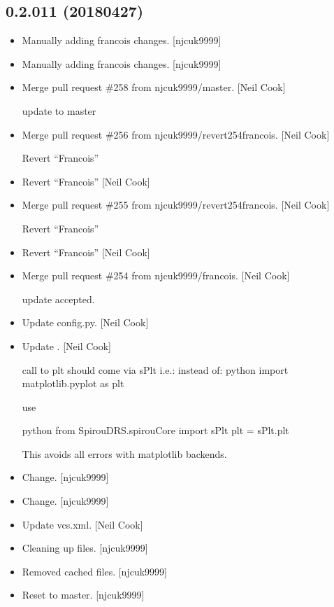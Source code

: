 \documentclass[a4paper,10pt,english]{report}
\begin{document}
\subsection{0.2.011 (2018\sphinxhyphen{}04\sphinxhyphen{}27)}
\label{\detokenize{misc/changelog:id471}}\begin{itemize}
\item {} 
Manually adding francois changes. {[}njcuk9999{]}

\item {} 
Manually adding francois changes. {[}njcuk9999{]}

\item {} 
Merge pull request \#258 from njcuk9999/master. {[}Neil Cook{]}

update to master

\item {} 
Merge pull request \#256 from njcuk9999/revert\sphinxhyphen{}254\sphinxhyphen{}francois. {[}Neil
Cook{]}

Revert “Francois”

\item {} 
Revert “Francois” {[}Neil Cook{]}

\item {} 
Merge pull request \#255 from njcuk9999/revert\sphinxhyphen{}254\sphinxhyphen{}francois. {[}Neil
Cook{]}

Revert “Francois”

\item {} 
Revert “Francois” {[}Neil Cook{]}

\item {} 
Merge pull request \#254 from njcuk9999/francois. {[}Neil Cook{]}

update accepted.

\item {} 
Update config.py. {[}Neil Cook{]}

\item {} 
Update . {[}Neil Cook{]}

call to plt should come via sPlt i.e.:
instead of:
python
import matplotlib.pyplot as plt

use

python
from SpirouDRS.spirouCore import sPlt
plt = sPlt.plt

This avoids all errors with matplotlib backends.

\item {} 
Change. {[}njcuk9999{]}

\item {} 
Change. {[}njcuk9999{]}

\item {} 
Update vcs.xml. {[}Neil Cook{]}

\item {} 
Cleaning up files. {[}njcuk9999{]}

\item {} 
Removed cached files. {[}njcuk9999{]}

\item {} 
Reset to master. {[}njcuk9999{]}

\end{itemize}
\end{document}
